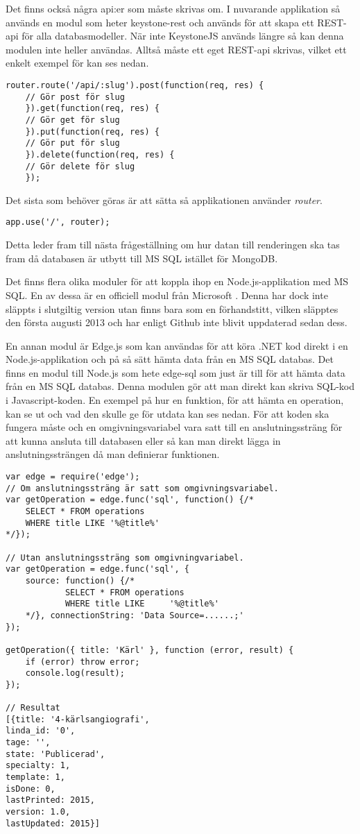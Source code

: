 Det finns också några api:er som måste skrivas om. I nuvarande applikation så används en modul som heter keystone-rest och används för att skapa ett REST-api för alla databasmodeller. När inte KeystoneJS används längre så kan denna modulen inte heller användas. Alltså måste ett eget REST-api skrivas, vilket ett enkelt exempel för kan ses nedan. 

\begin{verbatim}
router.route('/api/:slug').post(function(req, res) {
	// Gör post för slug
	}).get(function(req, res) {
	// Gör get för slug
	}).put(function(req, res) {
	// Gör put för slug
	}).delete(function(req, res) {
	// Gör delete för slug
	});
\end{verbatim}

Det sista som behöver göras är att sätta så applikationen använder \textit{router}.
\begin{verbatim}
app.use('/', router);
\end{verbatim}

Detta leder fram till nästa frågeställning om hur datan till renderingen ska tas fram då databasen är utbytt till MS SQL istället för MongoDB.

Det finns flera olika moduler för att koppla ihop en Node.js-applikation med MS SQL. En av dessa är en officiell modul från Microsoft \cite{sqlMS}. Denna har dock inte släppts i slutgiltig version utan finns bara som en förhandstitt, vilken släpptes den första augusti 2013 och har enligt Github inte blivit uppdaterad sedan dess.

En annan modul är Edge.js som kan användas för att köra .NET kod direkt i en Node.js-applikation och på så sätt hämta data från en MS SQL databas. Det finns en modul till Node.js som hete edge-sql som just är till för att hämta data från en MS SQL databas. Denna modulen gör att man direkt kan skriva SQL-kod i Javascript-koden. En exempel på hur en funktion, för att hämta en operation, kan se ut och vad den skulle ge för utdata kan ses nedan. För att koden ska fungera måste och en omgivningsvariabel vara satt till en anslutningssträng för att kunna ansluta till databasen eller så kan man direkt lägga in anslutningssträngen då man definierar funktionen. 


\begin{verbatim}
var edge = require('edge');
// Om anslutningssträng är satt som omgivningsvariabel.
var getOperation = edge.func('sql', function() {/*
    SELECT * FROM operations
    WHERE title LIKE '%@title%'
*/});

// Utan anslutningssträng som omgivningvariabel.
var getOperation = edge.func('sql', {
	source: function() {/*
    		SELECT * FROM operations
    		WHERE title LIKE	 '%@title%'
	*/}, connectionString: 'Data Source=......;'
});

getOperation({ title: 'Kärl' }, function (error, result) {
    if (error) throw error;
    console.log(result);
});

// Resultat
[{title: '4-kärlsangiografi',
linda_id: '0',
tage: '',
state: 'Publicerad',
specialty: 1,
template: 1,
isDone: 0,
lastPrinted: 2015,
version: 1.0,
lastUpdated: 2015}]

\end{verbatim}

